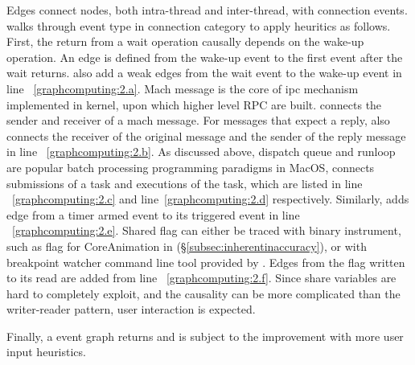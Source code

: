 Edges connect nodes, both intra-thread and inter-thread, with connection
events. \xxx walks through event type in connection category to apply heuritics as
follows. First, the return from a wait operation causally depends on the wake-up
operation. An edge is defined from the wake-up event to the first event after
the wait returns. \xxx also add a weak edges from the wait event to the wake-up
event in line ~\ref{graphcomputing:2.a}. Mach message is the core of ipc
mechanism implemented in kernel, upon which higher level RPC are built. \xxx
connects the sender and receiver of a mach message. For messages that expect a
reply, \xxx also connects the receiver of the original message and the sender
of the reply message in line ~\ref{graphcomputing:2.b}. As discussed above,
dispatch queue and runloop are popular batch processing programming paradigms
in MacOS, \xxx connects submissions of a task and executions of the task, which
are listed in line ~\ref{graphcomputing:2.c} and line~\ref{graphcomputing:2.d}
respectively. Similarly, \xxx adds edge from a timer armed event to its
triggered event in line ~\ref{graphcomputing:2.e}. Shared flag can either be
traced with binary instrument, such as  flag for CoreAnimation
in (\S\ref{subsec:inherentinaccuracy}), or with breakpoint watcher command line
tool provided by \xxx. Edges from the flag written to its read are added from
line ~\ref{graphcomputing:2.f}. Since share variables are hard to completely
exploit, and the causality can be more complicated than the writer-reader
pattern, user interaction is expected.

Finally, a event graph returns and is subject to the improvement with
more user input heuristics.


